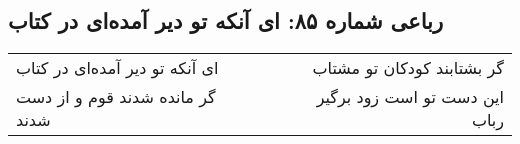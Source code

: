 \begin{center}
\section*{رباعی شماره ۸۵: ای آنکه تو دیر آمده‌ای در کتاب}
\label{sec:0085}
\begin{longtable}{l p{0.5cm} r}
ای آنکه تو دیر آمده‌ای در کتاب
&&
گر بشتابند کودکان تو مشتاب
\\
گر مانده شدند قوم و از دست شدند
&&
این دست تو است زود برگیر رباب
\\
\end{longtable}
\end{center}
